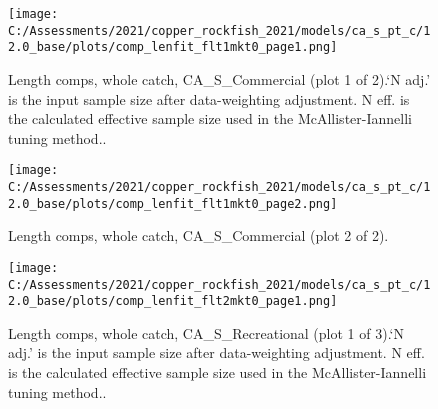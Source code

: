 \documentclass[11pt,
  english,
  a4paper,
]{article}
\begin{document}
\leavevmode\tagmcend\tagstructend


\begin{figure}
\centering
\texttt{[image: C:/Assessments/2021/copper\_rockfish\_2021/models/ca\_s\_pt\_c/12.0\_base/plots/comp\_lenfit\_flt1mkt0\_page1.png]}
\caption{Length comps, whole catch, CA\_S\_Commercial (plot 1 of 2).`N adj.' is the input sample size after data-weighting adjustment. N eff. is the calculated effective sample size used in the McAllister-Iannelli tuning method..\label{fig:comp_lenfit_flt1mkt0_page1}}
\end{figure}

\tagmcend\tagstructend


\begin{figure}
\centering
\texttt{[image: C:/Assessments/2021/copper\_rockfish\_2021/models/ca\_s\_pt\_c/12.0\_base/plots/comp\_lenfit\_flt1mkt0\_page2.png]}
\caption{Length comps, whole catch, CA\_S\_Commercial (plot 2 of 2).\label{fig:comp_lenfit_flt1mkt0_page2}}
\end{figure}

\tagmcend\tagstructend


\begin{figure}
\centering
\texttt{[image: C:/Assessments/2021/copper\_rockfish\_2021/models/ca\_s\_pt\_c/12.0\_base/plots/comp\_lenfit\_flt2mkt0\_page1.png]}
\caption{Length comps, whole catch, CA\_S\_Recreational (plot 1 of 3).`N adj.' is the input sample size after data-weighting adjustment. N eff. is the calculated effective sample size used in the McAllister-Iannelli tuning method..\label{fig:comp_lenfit_flt2mkt0_page1}}
\end{figure}
\end{document}
